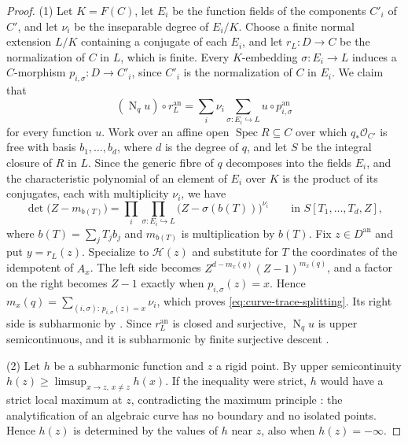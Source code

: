 \documentclass[11pt,a4paper]{article}
\newcommand{\an}{\mathrm{an}}          %
\newcommand{\Norm}{\operatorname{N}}
\begin{document}
\begin{proof}
(1) Let $K=F(C)$, let $E_i$ be the function fields of the components $C'_i$ of $C'$, and let $\nu_i$ be the inseparable degree of $E_i/K$. Choose a finite normal extension $L/K$ containing a conjugate of each $E_i$, and let $r_L\colon D\to C$ be the normalization of $C$ in $L$, which is finite. Every $K$-embedding $\sigma\colon E_i\to L$ induces a $C$-morphism $p_{i,\sigma}\colon D\to C'_i$, since $C'_i$ is the normalization of $C$ in $E_i$. We claim that
\begin{equation}\label{eq:curve-trace-splitting}
(\Norm_qu)\circ r_L^{\an}=\sum_i\nu_i\sum_{\sigma\colon E_i\hookrightarrow L}u\circ p_{i,\sigma}^{\an}
\end{equation}
for every function $u$. Work over an affine open $\operatorname{Spec}R\subseteq C$ over which $q_*\mathcal O_{C'}$ is free with basis $b_1,\ldots,b_d$, where $d$ is the degree of $q$, and let $S$ be the integral closure of $R$ in $L$. Since the generic fibre of $q$ decomposes into the fields $E_i$, and the characteristic polynomial of an element of $E_i$ over $K$ is the product of its conjugates, each with multiplicity $\nu_i$, we have
\[
\det\bigl(Z-m_{b(T)}\bigr)=\prod_i\prod_{\sigma\colon E_i\hookrightarrow L}\bigl(Z-\sigma(b(T))\bigr)^{\nu_i}\qquad\text{in }S[T_1,\ldots,T_d,Z],
\]
where $b(T)=\sum_jT_jb_j$ and $m_{b(T)}$ is multiplication by $b(T)$. Fix $z\in D^{\an}$ and put $y=r_L(z)$. Specialize to $\mathcal H(z)$ and substitute for $T$ the coordinates of the idempotent of $A_x$. The left side becomes $Z^{d-m_x(q)}(Z-1)^{m_x(q)}$, and a factor on the right becomes $Z-1$ exactly when $p_{i,\sigma}(z)=x$. Hence $m_x(q)=\sum_{(i,\sigma):\,p_{i,\sigma}(z)=x}\nu_i$, which proves \eqref{eq:curve-trace-splitting}. Its right side is subharmonic by \cite[Proposition~3.5(4),(8)]{GublerRabinoff25}. Since $r_L^{\an}$ is closed and surjective, $\Norm_qu$ is upper semicontinuous, and it is subharmonic by finite surjective descent \cite[Proposition~3.5(8)]{GublerRabinoff25}.

(2) Let $h$ be a subharmonic function and $z$ a rigid point. By upper semicontinuity $h(z)\ge\limsup_{x\to z,\,x\ne z}h(x)$. If the inequality were strict, $h$ would have a strict local maximum at $z$, contradicting the maximum principle \cite[Proposition~3.5(6)]{GublerRabinoff25}: the analytification of an algebraic curve has no boundary and no isolated points. Hence $h(z)$ is determined by the values of $h$ near $z$, also when $h(z)=-\infty$.


\end{proof}
\end{document}
